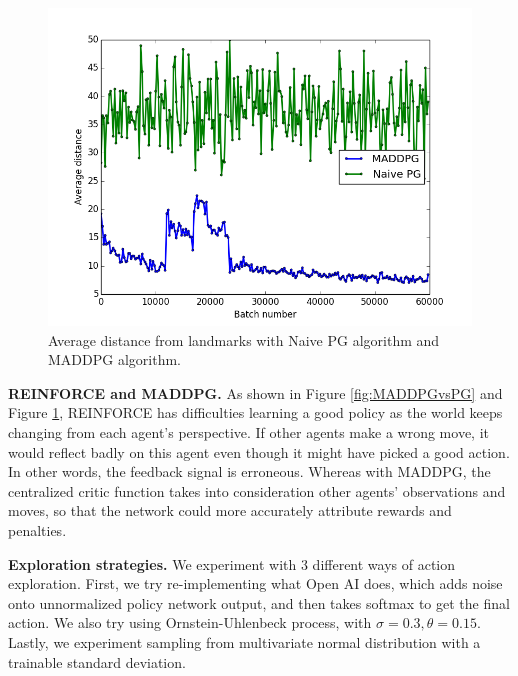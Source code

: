 \documentclass{article}
\begin{document}
\begin{figure}
\begin{center}
\includegraphics[scale=0.4]{MADDPGvsPG_distance}
\end{center}
\caption{Average distance from landmarks with Naive PG algorithm and MADDPG algorithm.}
\label{fig:MADDPGvsPG_distance}
\end{figure}

\textbf{REINFORCE and MADDPG.} As shown in Figure \ref{fig:MADDPGvsPG} and Figure \ref{fig:MADDPGvsPG_distance}, REINFORCE has difficulties learning a good policy as the world keeps changing from each agent's perspective. If other agents make a wrong move, it would reflect badly on this agent even though it might have picked a good action. In other words, the feedback signal is erroneous. Whereas with MADDPG, the centralized critic function takes into consideration other agents' observations and moves, so that the network could more accurately attribute rewards and penalties.  

\textbf{Exploration strategies.} We experiment with 3 different ways of action exploration. First, we try re-implementing what Open AI does, which adds noise onto unnormalized policy network output, and then takes softmax to get the final action. We also try using Ornstein-Uhlenbeck process, with $\sigma = 0.3, \theta = 0.15$. Lastly, we experiment sampling from multivariate normal distribution with a trainable standard deviation. 
\end{document}
